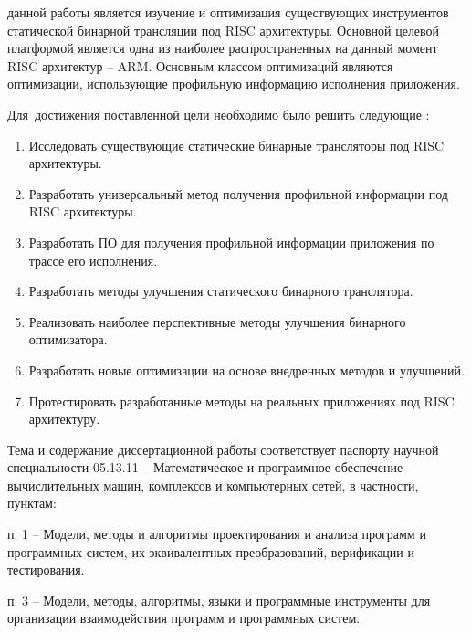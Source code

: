 {\aim} данной работы является изучение и оптимизация существующих инструментов статической бинарной трансляции под RISC архитектуры. Основной целевой платформой является одна из наиболее распространенных на данный момент RISC архитектур -- ARM. Основным классом оптимизаций являются оптимизации, использующие профильную информацию исполнения приложения.

Для~достижения поставленной цели необходимо было решить следующие {\tasks}:
\begin{enumerate}[beginpenalty=10000] %
  \item Исследовать существующие статические бинарные трансляторы под RISC архитектуры.
  \item Разработать универсальный метод получения профильной информации под RISC архитектуры.
  \item Разработать ПО для получения профильной информации приложения по трассе его исполнения.
  \item Разработать методы улучшения статического бинарного транслятора.
  \item Реализовать наиболее перспективные методы улучшения бинарного оптимизатора.
  \item Разработать новые оптимизации на основе внедренных методов и улучшений.
  \item Протестировать разработанные методы на реальных приложениях под RISC архитектуру.
\end{enumerate}

Тема и содержание диссертационной работы соответствует паспорту научной специальности 05.13.11 – Математическое и программное обеспечение вычислительных машин, комплексов и компьютерных сетей, в частности, пунктам:

п. 1 – Модели, методы и алгоритмы проектирования и анализа программ и программных систем, их эквивалентных преобразований, верификации и тестирования.

п. 3 – Модели, методы, алгоритмы, языки и программные инструменты для организации взаимодействия программ и программных систем.

